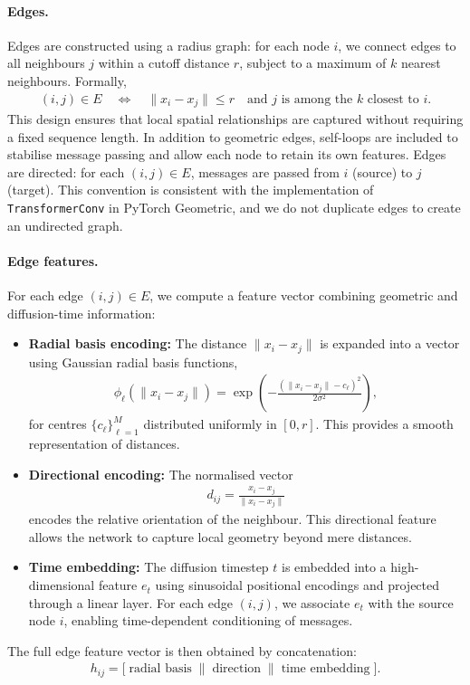 \documentclass[a4paper,12pt]{article}
\begin{document}
\paragraph{Edges.}
Edges are constructed using a radius graph: for each node \(i\), we connect edges to all neighbours \(j\) within a cutoff distance \(r\), subject to a maximum of \(k\) nearest neighbours. Formally,
\begin{align*}
    (i,j) \in E \quad \Leftrightarrow \quad \|x_i - x_j\| \leq r \quad \text{and } j \text{ is among the } k \text{ closest to } i.
\end{align*}
This design ensures that local spatial relationships are captured without requiring a fixed sequence length. In addition to geometric edges, self-loops are included to stabilise message passing and allow each node to retain its own features. Edges are directed: for each \((i,j) \in E\), messages are passed from \(i\) (source) to \(j\) (target). This convention is consistent with the implementation of \texttt{TransformerConv} in PyTorch Geometric, and we do not duplicate edges to create an undirected graph.

\paragraph{Edge features.}
For each edge \((i,j) \in E\), we compute a feature vector combining geometric and diffusion-time information:
\begin{itemize}
    \item \textbf{Radial basis encoding:} The distance \(\|x_i - x_j\|\) is expanded into a vector using Gaussian radial basis functions,
        \begin{align*}
            \phi_\ell(\|x_i - x_j\|) = \exp\!\left(-\frac{(\|x_i - x_j\|-c_\ell)^2}{2\sigma^2}\right),
        \end{align*}
        for centres \(\{c_\ell\}_{\ell=1}^M\) distributed uniformly in \([0,r]\). This provides a smooth representation of distances. 
    \item \textbf{Directional encoding:} The normalised vector
        \begin{align*}
            d_{ij} = \frac{x_i - x_j}{\|x_i - x_j\|}
        \end{align*}
        encodes the relative orientation of the neighbour. This directional feature allows the network to capture local geometry beyond mere distances. 
    \item \textbf{Time embedding:} The diffusion timestep \(t\) is embedded into a high-dimensional feature \(e_t\) using sinusoidal positional encodings and projected through a linear layer. For each edge \((i,j)\), we associate \(e_t\) with the source node \(i\), enabling time-dependent conditioning of messages.
\end{itemize}
The full edge feature vector is then obtained by concatenation:
\begin{align*}
    h_{ij} = \big[ \; \text{radial basis} \;\|\; \text{direction} \;\|\; \text{time embedding} \;\big].
\end{align*}
\end{document}
